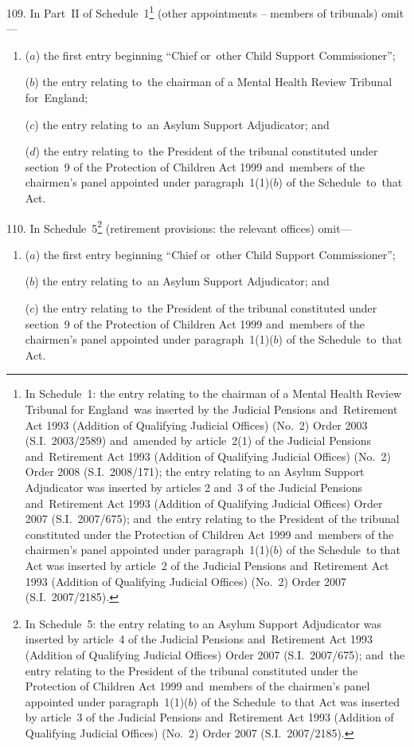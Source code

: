 \documentclass[12pt,a4paper]{article}
\begin{document}
109.  In Part~II of Schedule~1\footnote{In Schedule~1: the entry relating to the chairman of a Mental Health Review Tribunal for England~was inserted by the Judicial Pensions and~Retirement Act 1993 (Addition of Qualifying Judicial Offices) (No.~2) Order 2003 (S.I.~2003/2589) and~amended by article~2(1) of the Judicial Pensions and~Retirement Act 1993 (Addition of Qualifying Judicial Offices) (No.~2) Order 2008 (S.I.~2008/171); the entry relating to an Asylum Support Adjudicator was inserted by articles 2 and~3 of the Judicial Pensions and~Retirement Act 1993 (Addition of Qualifying Judicial Offices) Order 2007 (S.I.~2007/675); and~the entry relating to the President of the tribunal constituted under the Protection of Children Act 1999 and~members of the chairmen’s panel appointed under paragraph~1(1)($b$) of the Schedule~to that Act was inserted by article~2 of the Judicial Pensions and~Retirement Act 1993 (Addition of Qualifying Judicial Offices) (No.~2) Order 2007 (S.I.~2007/2185).} (other appointments – members of tribunals) omit—
\begin{enumerate}\item[]
($a$) the first entry beginning “Chief or~other Child Support Commissioner”;

($b$) the entry relating to~the chairman of a Mental Health Review Tribunal for~England;

($c$) the entry relating to~an Asylum Support Adjudicator; and

($d$) the entry relating to~the President of the tribunal constituted under section~9 of the Protection of Children Act 1999 and~members of the chairmen’s panel appointed under paragraph~1(1)($b$)  of the Schedule~to~that Act.
\end{enumerate}

110.  In Schedule~5\footnote{In Schedule~5: the entry relating to an Asylum Support Adjudicator was inserted by article~4 of the Judicial Pensions and~Retirement Act 1993 (Addition of Qualifying Judicial Offices) Order 2007 (S.I.~2007/675); and~the entry relating to the President of the tribunal constituted under the Protection of Children Act 1999 and~members of the chairmen’s panel appointed under paragraph~1(1)($b$) of the Schedule~to that Act was inserted by article~3 of the Judicial Pensions and~Retirement Act 1993 (Addition of Qualifying Judicial Offices) (No.~2) Order 2007 (S.I.~2007/2185).} (retirement provisions: the relevant offices) omit—
\begin{enumerate}\item[]
($a$) the first entry beginning “Chief or~other Child Support Commissioner”;

($b$) the entry relating to~an Asylum Support Adjudicator; and

($c$) the entry relating to~the President of the tribunal constituted under section~9 of the Protection of Children Act 1999 and~members of the chairmen’s panel appointed under paragraph~1(1)($b$)  of the Schedule~to~that Act.
\end{enumerate}
\end{document}
